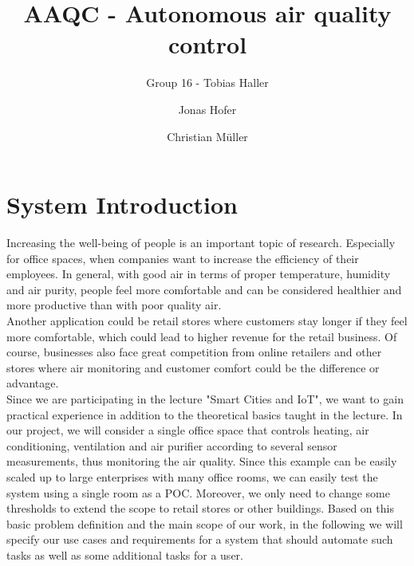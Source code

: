 \documentclass[runningheads]{llncs}
\begin{document}
%
    \title{AAQC - Autonomous air quality control}


    \author{Group 16 - Tobias Haller \and Jonas Hofer \and Christian M\"uller}


%
    \maketitle              %
%
%    


    \section{System Introduction}
Increasing the well-being of people is an important topic of research. Especially for office spaces, when companies want to increase the efficiency of their employees. In general, with good air in terms of proper temperature, humidity and air purity, people feel more comfortable and can be considered healthier and more productive than with poor quality air. \\
Another application could be retail stores where customers stay longer if they feel more comfortable, which could lead to higher revenue for the retail business. Of course, businesses also face great competition from online retailers and other stores where air monitoring and customer comfort could be the difference or advantage. \\
Since we are participating in the lecture "Smart Cities and IoT", we want to gain practical experience in addition to the theoretical basics taught in the lecture. In our project, we will consider a single office space that controls heating, air conditioning, ventilation and air purifier according to several sensor measurements, thus monitoring the air quality. Since this example can be easily scaled up to large enterprises with many office rooms, we can easily test the system using a single room as a POC. Moreover, we only need to change some thresholds to extend the scope to retail stores or other buildings. Based on this basic problem definition and the main scope of our work, in the following we will specify our use cases and requirements for a system that should automate such tasks as well as some additional tasks for a user.
\end{document}
